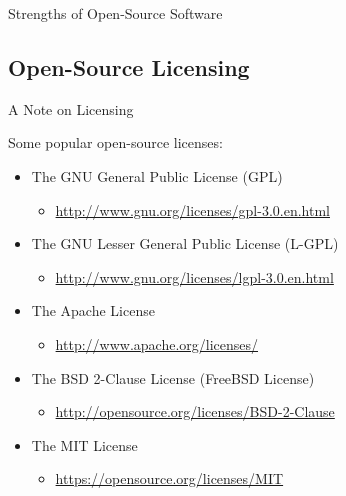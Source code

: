 \documentclass[10pt]{beamer}
\begin{document}
{\begin{frame}{Strengths of Open-Source Software}
\end{frame}


\subsection{Open-Source Licensing}


\begin{frame}{A Note on Licensing}

  Some popular open-source licenses:
  \vb
  \begin{itemize}
  \item The GNU General Public License (GPL)
    \begin{itemize}
    \item \url{http://www.gnu.org/licenses/gpl-3.0.en.html}
    \end{itemize}
    \vc
  \item The GNU Lesser General Public License (L-GPL)
    \begin{itemize}
    \item \url{http://www.gnu.org/licenses/lgpl-3.0.en.html}
    \end{itemize}
    \vc
  \item The Apache License
    \begin{itemize}
    \item \url{http://www.apache.org/licenses/}
    \end{itemize}
    \vc
  \item The BSD 2-Clause License (FreeBSD License)
    \begin{itemize}
    \item \url{http://opensource.org/licenses/BSD-2-Clause}
    \end{itemize}
    \vc
  \item The MIT License
    \begin{itemize}
    \item \url{https://opensource.org/licenses/MIT}
    \end{itemize}
  \end{itemize}

\end{frame}


}
\end{document}
